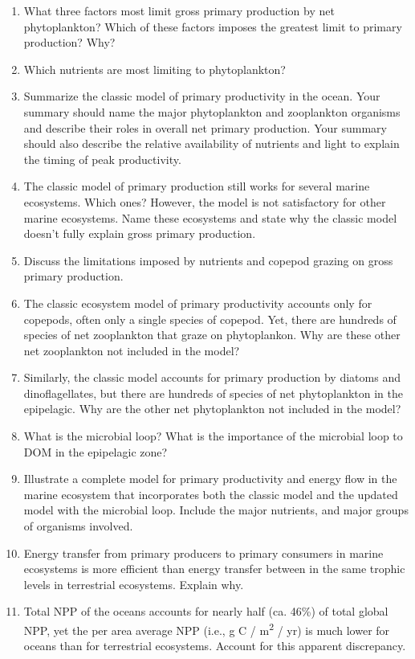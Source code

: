 \documentclass[nofonts, letterpaper]{tufte-handout}
\begin{document}
\begin{enumerate}
\item
  What three factors most limit gross primary production by net
  phytoplankton? Which of these factors imposes the greatest limit to
  primary production? Why?
\item
  Which nutrients are most limiting to phytoplankton?
\item
  Summarize the classic model of primary productivity in the ocean. Your
  summary should name the major phytoplankton and zooplankton organisms
  and describe their roles in overall net primary production. Your
  summary should also describe the relative availability of nutrients
  and light to explain the timing of peak productivity.
\item
  The classic model of primary production still works for several marine
  ecosystems. Which ones? However, the model is not satisfactory for
  other marine ecosystems. Name these ecosystems and state why the
  classic model doesn't fully explain gross primary production.
\item
  Discuss the limitations imposed by nutrients and copepod grazing on
  gross primary production.
\item
  The classic ecosystem model of primary productivity accounts only for
  copepods, often only a single species of copepod. Yet, there are
  hundreds of species of net zooplankton that graze on phytoplankon. Why
  are these other net zooplankton not included in the model?
\item
  Similarly, the classic model accounts for primary production by
  diatoms and dinoflagellates, but there are hundreds of species of net
  phytoplankton in the epipelagic. Why are the other net phytoplankton
  not included in the model?
\item
  What is the microbial loop? What is the importance of the microbial
  loop to DOM in the epipelagic zone?
\item
  Illustrate a complete model for primary productivity and energy flow
  in the marine ecosystem that incorporates both the classic model and
  the updated model with the microbial loop. Include the major
  nutrients, and major groups of organisms involved.
\item
  Energy transfer from primary producers to primary consumers in marine
  ecosystems is more efficient than energy transfer between in the same
  trophic levels in terrestrial ecosystems. Explain why.
\item
  Total NPP of the oceans accounts for nearly half (ca. 46\%) of total
  global NPP, yet the per area average NPP (i.e., g C /
  m\textsuperscript{2} / yr) is much lower for oceans than for
  terrestrial ecosystems. Account for this apparent discrepancy.
 \end{enumerate}
\end{document}

